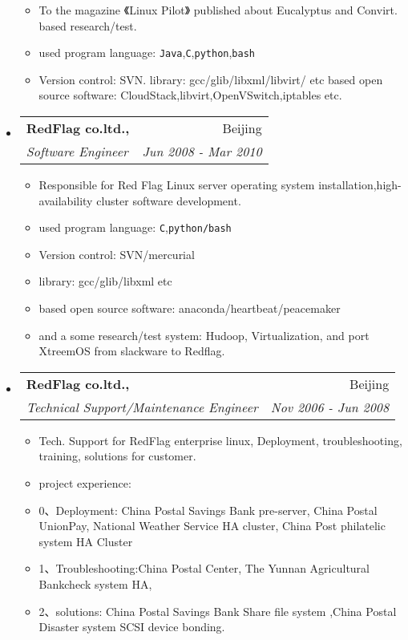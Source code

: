 \documentclass[letterpaper,11pt]{article}
\makeatletter
\newcommand{\resitem}[1]{\item #1 \vspace{-2pt}}
\newcommand{\ressubheading}[4]{

\begin{tabular*}{6.5in}{l@{\cftdotfill{\cftsecdotsep}\extracolsep{\fill}}r}

		\textbf{#1} & #2 \\

		\textit{#3} & \textit{#4} \\

\end{tabular*}\vspace{-6pt}}
\makeatother
\begin{document}
\begin{itemize}
\begin{itemize}
                \resitem{To the magazine 《Linux Pilot》 published about Eucalyptus and Convirt. based research/test.}

                \resitem{used program language: \texttt{Java},\texttt{C},\texttt{python},\texttt{bash}}
               
               \resitem{Version control: SVN. library: gcc/glib/libxml/libvirt/ etc based open source software: CloudStack,libvirt,OpenVSwitch,iptables etc.}

	\end{itemize}

\item

	\ressubheading{RedFlag co.ltd., }{Beijing}{Software Engineer}{Jun 2008 - Mar 2010}

	\begin{itemize}

		\resitem{Responsible for Red Flag Linux server operating system installation,high-availability cluster software development.}

    \resitem{used program language: \texttt{C},\texttt{python/bash}}
    \resitem{Version control: SVN/mercurial}
    \resitem{library: gcc/glib/libxml etc}
    \resitem{based open source software: anaconda/heartbeat/peacemaker}
    \resitem{and a some research/test system: Hudoop, Virtualization, and port XtreemOS from slackware to Redflag.}

	\end{itemize}

\item 

	\ressubheading{RedFlag co.ltd.,}{Beijing}{Technical Support/Maintenance Engineer}{Nov 2006 - Jun 2008}

	\begin{itemize}

		\resitem{Tech. Support for RedFlag enterprise linux, Deployment, troubleshooting, training, solutions for customer.}

    \resitem{project experience:}
    \resitem{0、Deployment: China Postal Savings Bank pre-server, China Postal UnionPay, National Weather Service HA cluster, China Post philatelic system HA Cluster}
    \resitem{1、Troubleshooting:China Postal Center, The Yunnan Agricultural Bankcheck system HA,}
    \resitem{2、solutions: China Postal Savings Bank Share file system ,China Postal Disaster system SCSI device bonding.}

	\end{itemize}


\end{itemize}
\end{document}
